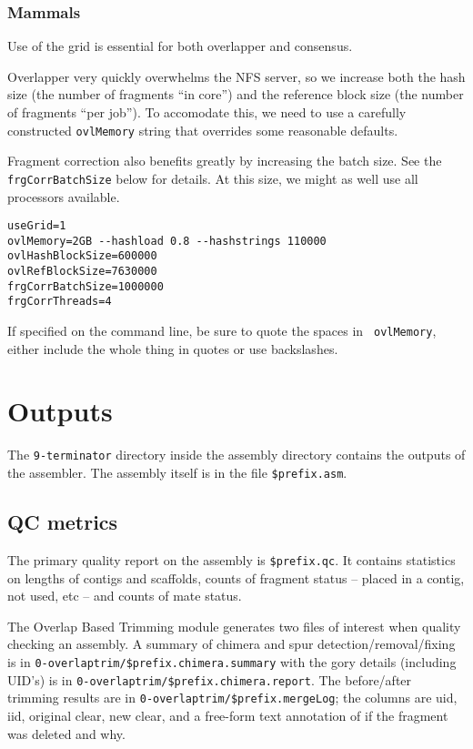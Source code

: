 \documentclass[twoside,11pt]{article}
\begin{document}
\subsubsection{Mammals}

Use of the grid is essential for both overlapper and consensus.

Overlapper very quickly overwhelms the NFS server, so we increase both
the hash size (the number of fragments ``in core'') and the reference
block size (the number of fragments ``per job'').  To accomodate this,
we need to use a carefully constructed {\tt ovlMemory} string that
overrides some reasonable defaults.

Fragment correction also benefits greatly by increasing the batch
size.  See the {\tt frgCorrBatchSize} below for details.  At this
size, we might as well use all processors available.

\begin{verbatim}
useGrid=1
ovlMemory=2GB --hashload 0.8 --hashstrings 110000
ovlHashBlockSize=600000
ovlRefBlockSize=7630000
frgCorrBatchSize=1000000
frgCorrThreads=4
\end{verbatim}

If specified on the command line, be sure to quote the spaces in {\tt
ovlMemory}, either include the whole thing in quotes or use backslashes.

\section{Outputs}

The {\tt 9-terminator} directory inside the assembly directory
contains the outputs of the assembler.  The assembly itself is in the
file {\tt \$prefix.asm}.

\subsection{QC metrics}

The primary quality report on the assembly is {\tt \$prefix.qc}.  It
contains statistics on lengths of contigs and scaffolds, counts of
fragment status -- placed in a contig, not used, etc -- and counts of
mate status.

The Overlap Based Trimming module generates two files of interest
when quality checking an assembly.  A summary of chimera and spur
detection/removal/fixing is in {\tt 0-overlaptrim/\$prefix.chimera.summary} with the gory
details (including UID's) is in {\tt 0-overlaptrim/\$prefix.chimera.report}.  The
before/after trimming results are in {\tt 0-overlaptrim/\$prefix.mergeLog}; the columns are
uid, iid, original clear, new clear, and a free-form text annotation
of if the fragment was deleted and why.
\end{document}
